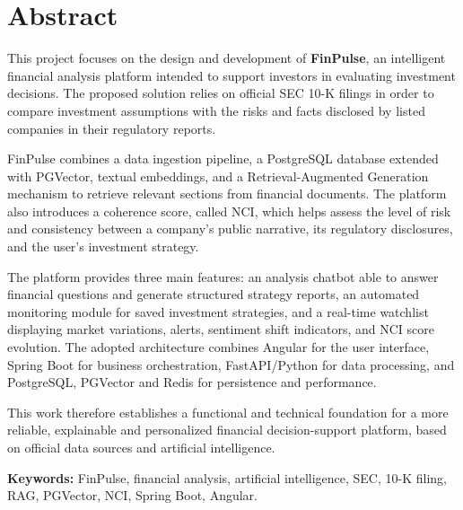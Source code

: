 \chapter*{Abstract}

This project focuses on the design and development of \textbf{FinPulse}, an
intelligent financial analysis platform intended to support investors in evaluating
investment decisions. The proposed solution relies on official SEC 10-K filings in
order to compare investment assumptions with the risks and facts disclosed by listed
companies in their regulatory reports.

FinPulse combines a data ingestion pipeline, a PostgreSQL database extended with
PGVector, textual embeddings, and a Retrieval-Augmented Generation mechanism to
retrieve relevant sections from financial documents. The platform also introduces a
coherence score, called NCI, which helps assess the level of risk and consistency
between a company's public narrative, its regulatory disclosures, and the user's
investment strategy.

The platform provides three main features: an analysis chatbot able to answer
financial questions and generate structured strategy reports, an automated monitoring
module for saved investment strategies, and a real-time watchlist displaying market
variations, alerts, sentiment shift indicators, and NCI score evolution. The adopted
architecture combines Angular for the user interface, Spring Boot for business
orchestration, FastAPI/Python for data processing, and PostgreSQL, PGVector and Redis
for persistence and performance.

This work therefore establishes a functional and technical foundation for a more
reliable, explainable and personalized financial decision-support platform, based on
official data sources and artificial intelligence.

\textbf{Keywords:} FinPulse, financial analysis, artificial intelligence, SEC, 10-K
filing, RAG, PGVector, NCI, Spring Boot, Angular.
